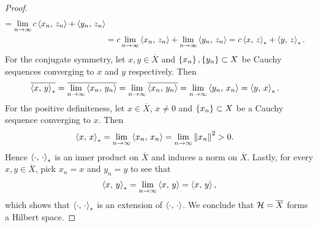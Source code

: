 \begin{proof}
\begin{equation*}
\begin{split}
            = \lim_{n\to\infty}c\left\langle {x_n},\, {z_n} \right\rangle + \left\langle {y_n},\, {z_n} \right\rangle \\
            &= c\lim_{n\to\infty}\left\langle {x_n},\, {z_n} \right\rangle + \lim_{n\to\infty}\left\langle {y_n},\, {z_n} \right\rangle 
            = c\left\langle {x},\, {z} \right\rangle_* + \left\langle {y},\, {z} \right\rangle_*.
        \end{split}
    \end{equation*}
    For the conjugate symmetry, let $x,y\in\overline{X}$ and $\left\{ {x_n} \right\},
    \left\{ {y_n} \right\}\subset X$ be Cauchy sequences converging to $x$ and $y$ 
    respectively. Then 
    \begin{equation*}
        \begin{split}
            \overline{\left\langle {x},\, {y} \right\rangle_*} &= \overline{\lim_{n\to\infty}\left\langle {x_n},\, {y_n} \right\rangle} 
            = \lim_{n\to\infty}\overline{\left\langle {x_n},\, {y_n} \right\rangle} 
            = \lim_{n\to\infty}\left\langle {y_n},\, {x_n} \right\rangle = \left\langle {y},\, {x} \right\rangle_*.
        \end{split}
    \end{equation*}
    For the positive definiteness, let $x\in\overline{X}$, $x\neq 0$ and 
    $\left\{ {x_n} \right\}\subset X$ be a Cauchy sequence converging to $x$. Then 
    \begin{equation*}
        \begin{split}
            \left\langle {x},\, {x} \right\rangle_* &= \lim_{n\to\infty}\left\langle {x_n},\, {x_n} \right\rangle 
            = \lim_{n\to\infty}\left\lVert {x_n} \right\rVert^2 > 0.
        \end{split}
    \end{equation*}
    Hence $\left\langle {\cdot},\, {\cdot} \right\rangle_*$ is an inner product on $\overline{X}$ and 
    induces a norm on $\overline{X}$. Lastly, for every $x,y\in\overline{X}$, 
    pick $x_n = x$ and $y_n = y$ to see that 
    \begin{equation*}
        \left\langle {x},\, {y} \right\rangle_* = \lim_{n\to\infty}\left\langle {x},\, {y} \right\rangle = \left\langle {x},\, {y} \right\rangle,
    \end{equation*}
    which shows that $\left\langle {\cdot},\, {\cdot} \right\rangle_*$ is an extension of 
    $\left\langle {\cdot},\, {\cdot} \right\rangle$. We conclude that $\mathcal{H} = \overline{X}$ forms a 
    Hilbert space.
\end{proof}

